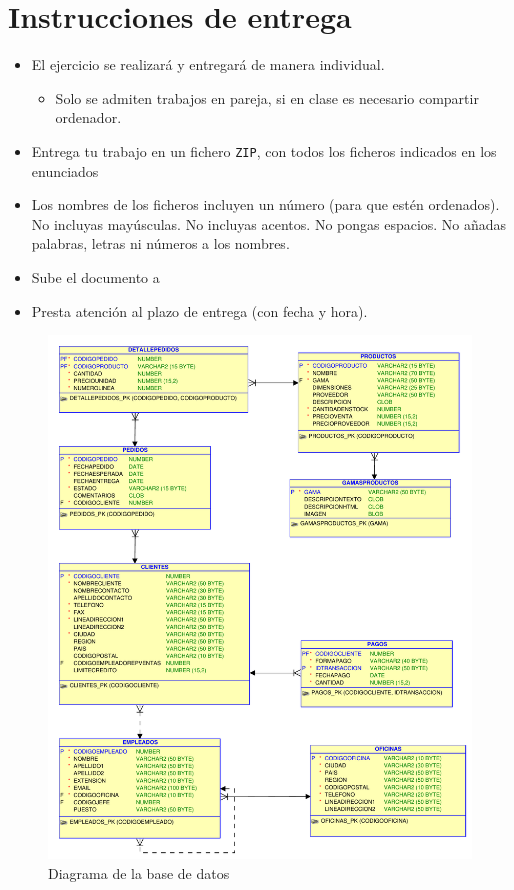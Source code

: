 \section{Instrucciones de entrega}
\begin{itemize}
\item El ejercicio se realizará y entregará de manera individual.
  \begin{itemize}
  \item Solo se admiten trabajos en pareja, si en clase es necesario compartir ordenador.
  \end{itemize}
\item Entrega tu trabajo en un fichero \texttt{ZIP}, con todos los ficheros indicados en los enunciados
\item Los nombres de los ficheros incluyen un número (para que estén ordenados). No incluyas mayúsculas. No incluyas acentos. No pongas espacios. No añadas palabras, letras ni números a los nombres.
\item Sube el documento a 
\item Presta atención al plazo de entrega (con fecha y hora).  
\end{itemize}



\begin{figure}[h]
  \begin{center}
    \includegraphics[width=.9\textwidth]{./jardineria.pdf}
  \end{center}
  \caption{Diagrama de la base de datos}\label{fig:esquema}
\end{figure}






